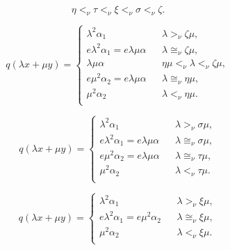 \documentclass{article}
\begin{document}
\begin{equation}\label{eq:II.7.6}
\eta {<_\nu} \tau {<_\nu} {\xi} {<_\nu} {\sigma} {<_\nu} {\zeta}.
\end{equation}

\begin{equation}
  \label{eq:II.7.7}
  q({\lambda} x + \mu y ) = \left\{
    \begin{array}{lll}
      {\lambda}^2 {\alpha}_1 & &  {\lambda} {>_\nu} {\zeta} \mu, \\[1mm]
      e {\lambda}^2 {\alpha}_1 = e {\lambda} \mu {\alpha}  &  & {\lambda} {\cong_\nu} {\zeta} \mu, \\[1mm]
      {\lambda} \mu {\alpha}  &  & \eta \mu {<_\nu} {\lambda} {<_\nu} {\zeta} \mu, \\[1mm]
       e \mu^2 {\alpha}_2 = e {\lambda} \mu {\alpha}  &  &  {\lambda} {\cong_\nu} \eta \mu, \\[1mm]
      \mu^2 {\alpha}_2 &  & {\lambda} {<_\nu} \eta \mu. \\
    \end{array}
  \right.
    \end{equation}

\begin{equation}\label{eq:II.7.8}
   q({\lambda} x + \mu y ) = \left\{
    \begin{array}{lll}
      {\lambda}^2 {\alpha}_1 & &  {\lambda} {>_\nu} {\sigma} \mu, \\[1mm]
      e {\lambda}^2 {\alpha}_1 = e {\lambda} \mu {\alpha}  &  & {\lambda} {\cong_\nu} {\sigma} \mu, \\[1mm]
       e \mu^2 {\alpha}_2 = e {\lambda} \mu {\alpha}  &  &  {\lambda} {\cong_\nu} \tau \mu, \\[1mm]
      \mu^2 {\alpha}_2 &  & {\lambda} {<_\nu} \tau \mu. \\
    \end{array}
  \right.
  \end{equation}

\begin{equation}\label{eq:II.7.9}
   q({\lambda} x + \mu y ) = \left\{
    \begin{array}{lll}
      {\lambda}^2 {\alpha}_1 & &  {\lambda} {>_\nu} {\xi} \mu , \\[1mm]
       e {\lambda}^2 {\alpha}_1 = e \mu^2 {\alpha}_2  &  &  {\lambda} {\cong_\nu} {\xi} \mu, \\[1mm]
      \mu^2 {\alpha}_2 &  & {\lambda} {<_\nu} {\xi} \mu. \\
    \end{array}
  \right.
  \end{equation}
\end{document}
